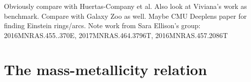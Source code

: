 \documentclass[fleqn,usenatbib]{mnras}
\begin{document}
Obviously compare with Huertas-Company et al.
Also look at Viviana's work as benchmark.
Compare with Galaxy Zoo as well.
Maybe CMU Deeplens paper for finding Einstein rings/arcs.
Note work from Sara Ellison's group: 
2016MNRAS.455..370E, 2017MNRAS.464.3796T, 2016MNRAS.457.2086T 



%
%

\section{The mass-metallicity relation} \label{sec:MMR}
\end{document}
